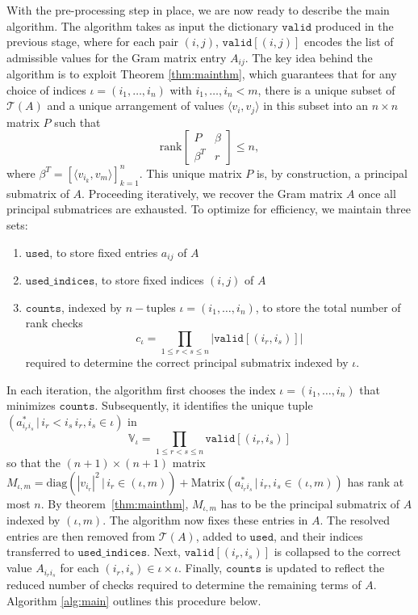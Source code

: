 \documentclass{article}
\theoremstyle{definition}
\newcommand{\ip}[2]{\langle {#1}, {#2} \rangle}
\renewcommand{\|}{|}
\renewcommand{\t}{\mathcal{T}}
\newcommand{\valid}{\texttt{valid}}
\newcommand{\counts}{\texttt{counts}}
\newcommand{\used}{\texttt{used}}
\newcommand{\usedind}{\texttt{used\_indices}}
\begin{document}
With the pre-processing step in place, we are now ready to describe the main algorithm. The algorithm takes as input the dictionary $\valid$ produced in the previous stage, where for each pair $(i,j)$, $\valid[(i,j)]$ encodes the list of admissible values for the Gram matrix entry $A_{ij}$. The key idea behind the algorithm is to exploit Theorem \ref{thm:mainthm}, which guarantees that for any choice of indices $\iota = (i_1,\dots, i_{n})$ with $i_1,\dots, i_n < m$, there is a unique subset of $\t(A)$ and a unique arrangement of values $\ip{v_i}{v_j}$ in this subset into an $n \times n$ matrix $P$ such that 
$$\mathrm{rank} \begin{bmatrix}
    P & \beta \\
    \beta^T & r
\end{bmatrix} \leq n,$$
where $\beta^T = [\ip{v_{i_k}}{v_m}]_{k=1}^n$. This unique matrix $P$ is, by construction, a principal submatrix of $A$. Proceeding iteratively, we recover the Gram matrix $A$ once all principal submatrices are exhausted. To optimize for efficiency, we maintain three sets: 
\begin{enumerate}
    \item $\used$, to store fixed entries $a_{ij}$ of $A$
    \item $\usedind$, to store fixed indices $(i,j)$ of $A$
    \item $\counts$, indexed by $n-$tuples $\iota = (i_1,\dots, i_n)$, to store the total number of rank checks 
    \begin{equation}
    c_{\iota} = \prod_{1\leq r<s \leq n} |\valid[(i_r,i_s)]|        
    \end{equation}
required to determine the correct principal submatrix indexed by $\iota$. 
\end{enumerate}

In each iteration, the algorithm first chooses the index $\iota = (i_1,\dots, i_n)$ that minimizes $\counts$. Subsequently, it identifies the unique tuple $(a_{i_ri_s}^* \, | \, i_r<i_s \, i_r,i_s \in \iota)$ in 
\begin{equation}
\mathbb{V}_\iota = \prod_{1\leq r<s \leq n}\valid[(i_r,i_s)]    
\end{equation}
 so that the $(n+1) \times (n+1)$ matrix $M_{\iota,m} = \mathrm{diag}(\|v_{i_r}\|^2 \, | \, i_r \in (\iota, m)) + \mathrm{Matrix}(a_{i_ri_s}^* \, | \, i_r,i_s \in (\iota, m))$ has rank at most $n$. By theorem~\ref{thm:mainthm}, $M_{\iota,m}$ has to be the principal submatrix of $A$ indexed by $(\iota, m)$. The algorithm now fixes these entries in $A$. The resolved entries are then removed from $\t(A)$, added to $\used$, and their indices transferred to $\usedind$. Next, $\valid[(i_r,i_s)]$ is collapsed to the correct value $A_{i_ri_s}$ for each $(i_r,i_s) \in \iota \times \iota$. Finally, $\counts$ is updated to reflect the reduced number of checks required to determine the remaining terms of $A$. Algorithm \ref{alg:main} outlines this procedure below.
\end{document}
